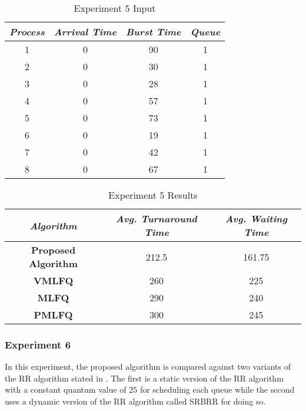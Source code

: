 \documentclass[conference]{IEEEtran}
\newcommand\T{\rule{0pt}{2.6ex}}       %
\newcommand\B{\rule[-1.2ex]{0pt}{0pt}} %
\begin{document}
\begin{table}[H]
    \caption{Experiment 5 Input}
    \centering
     \begin{tabular}{||c c c c||} 
     \hline
     \textit{\textbf{Process}} & \textit{\textbf{Arrival Time}} & \textit{\textbf{Burst Time}} & \textit{\textbf{Queue}} \T \B \\ 
     \hline
     \hline
     1 & 0 & 90 & 1 \T \B \\ 
     \hline
     2 & 0 & 30 & 1 \T \B \\
     \hline
     3 & 0 & 28 & 1 \T \B \\
     \hline
     4 & 0 & 57 & 1 \T \B \\
     \hline
     5 & 0 & 73 & 1 \T \B \\ 
     \hline
     6 & 0 & 19 & 1 \T \B \\ 
     \hline
     7 & 0 & 42 & 1 \T \B \\ 
     \hline
     8 & 0 & 67 & 1 \T \B \\ 
     \hline
     \end{tabular}
\end{table}

\begin{table}[H]
    \caption{Experiment 5 Results}
    \centering
    \begin{tabular}{||c c c||}
        \hline
        \textit{\textbf{Algorithm}} & \textit{\textbf{Avg. Turnaround Time}} & \textit{\textbf{Avg. Waiting Time}}\T \B \\
    \hline
    \hline
    \textbf{Proposed Algorithm} & 212.5 & 161.75 \T \B\\ \hline
    \textbf{VMLFQ} & 260 & 225 \T \B\\ \hline
    \textbf{MLFQ} & 290 & 240 \T \B\\ \hline
    \textbf{PMLFQ} & 300 & 245 \T \B\\ \hline
     \end{tabular}
\end{table}

\subsubsection{Experiment 6}

In this experiment, the proposed algorithm is compared against two variants of the RR algorithm stated in \cite{b3}. The first is a static version of the RR algorithm with a constant quantum value of $25$ for scheduling each queue while the second uses a dynamic version of the RR algorithm called SRBRR for doing so. 
\end{document}
